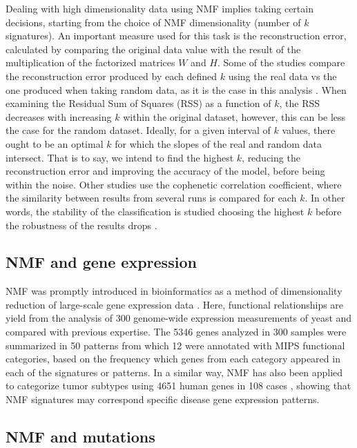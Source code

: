 Dealing with high dimensionality data using NMF implies taking certain decisions, starting from the choice of NMF dimensionality (number of $k$ signatures). An important measure used for this task is the reconstruction error, calculated by comparing the original data value with the result of the multiplication of the factorized matrices $W$ and $H$. Some of the studies compare the reconstruction error produced by each defined $k$ using the real data vs the one produced when taking random data, as it is the case in this analysis \cite{Frigyesi2008}. When examining the Residual Sum of Squares (RSS) as a function of $k$, the RSS decreases with increasing $k$ within the original dataset, however, this can be less the case for the random dataset. Ideally, for a given interval of $k$ values, there ought to be an optimal $k$ for which the slopes of the real and random data intersect. That is to say, we intend to find the highest $k$, reducing the reconstruction error and improving the accuracy of the model, before being within the noise. Other studies use the cophenetic correlation coefficient, where the similarity between results from several runs is compared for each $k$. In other words, the stability of the classification is studied choosing the highest $k$ before the robustness of the results drops \cite{Brunet2004}.

\subsection{NMF and gene expression}

NMF was promptly introduced in bioinformatics as a method of dimensionality reduction of large-scale gene expression data \cite{Kim2003}. Here, functional relationships are yield from the analysis of 300 genome-wide expression measurements of yeast and compared with previous expertise. The 5346 genes analyzed in 300 samples were summarized in 50 patterns from which 12 were annotated with MIPS \cite{Mewes2002} functional categories, based on the frequency which genes from each category appeared in each of the signatures or patterns. In a similar way, NMF has also been applied to categorize tumor subtypes using 4651 human genes in 108 cases \cite{Frigyesi2008}, showing that NMF signatures may correspond specific disease gene expression patterns.

\subsection{NMF and mutations}

